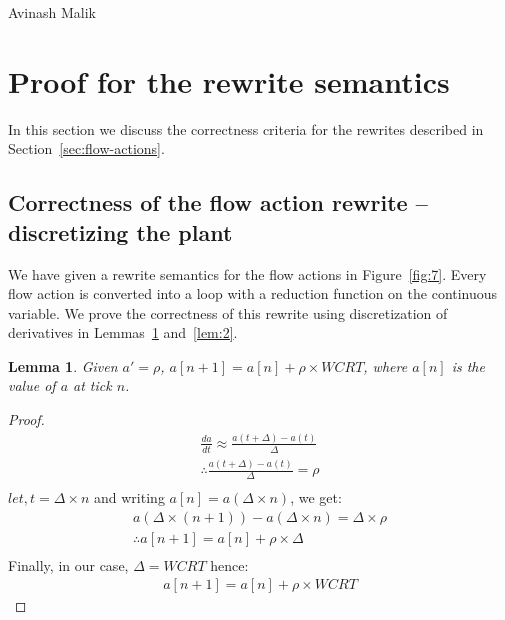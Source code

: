 \documentclass[10pt,journal,cspaper,compsoc]{IEEEtran}
\newtheorem{lem}{Lemma}
\begin{document}





\begin{IEEEbiography}{Avinash Malik}
\end{IEEEbiography}









\newpage
\appendices

\section{Proof for the rewrite semantics}
\label{sec:disc-rewr-semant}

In this section we discuss the correctness criteria for the rewrites
described in Section~\ref{sec:flow-actions}.

\subsection{Correctness of the flow action rewrite -- discretizing the
  plant}
\label{sec:soundn-flow-acti}

We have given a rewrite semantics for the flow actions in
Figure~\ref{fig:7}. Every flow action is converted into a loop with a
reduction function on the continuous variable. We prove the correctness
of this rewrite using discretization of derivatives in
Lemmas~\ref{lem:1} and~\ref{lem:2}.

\begin{lem}
  Given $a' = \rho$, $a[n+1] = a[n] + \rho \times WCRT$, where $a[n]$ is
  the value of $a$ at tick $n$.
 \label{lem:1}
\end{lem}

\begin{proof}
  \begin{align*}
   \frac{da}{dt} \approx \frac{a(t+\Delta) - a(t)}{\Delta}\\
   \therefore \frac{a(t+\Delta) - a(t)}{\Delta} = \rho \\
  \end{align*}
  $let, t = \Delta\times n$ and writing $a[n] = a(\Delta\times n)$, we
  get:
  \begin{align*}
   a(\Delta \times (n+1)) - a(\Delta \times n) = \Delta
   \times \rho\\
   \therefore a[n+1] = a[n] + \rho \times \Delta\\
  \end{align*}
Finally, in our case, $\Delta = WCRT$ hence:
\begin{align*}
   a[n+1] = a[n] + \rho \times WCRT
\end{align*}
\end{proof}
\end{document}
